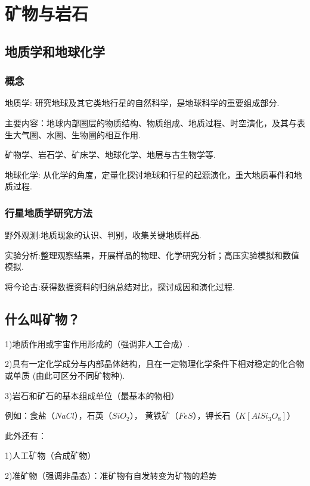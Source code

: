 \documentclass[12pt,a4paper]{article}
\begin{document}
	\section{矿物与岩石}
	
	\subsection{地质学和地球化学}
	\subsubsection{概念}
	地质学: 研究地球及其它类地行星的自然科学，是地球科学的重要组成部分.
	
	主要内容：地球内部圈层的物质结构、物质组成、地质过程、时空演化，及其与表生大气圈、水圈、生物圈的相互作用.
	
	矿物学、岩石学、矿床学、地球化学、地层与古生物学等.
	
	地球化学: 从化学的角度，定量化探讨地球和行星的起源演化，重大地质事件和地质过程.
	
	\subsubsection{行星地质学研究方法}
	野外观测:地质现象的认识、判别，收集关键地质样品.
	
	实验分析:整理观察结果，开展样品的物理、化学研究分析；高压实验模拟和数值模拟.
	
	将今论古:获得数据资料的归纳总结对比，探讨成因和演化过程.
	
	\subsection{什么叫矿物？}
	1)地质作用或宇宙作用形成的（强调非人工合成）.
	
	2)具有一定化学成分与内部晶体结构，且在一定物理化学条件下相对稳定的化合物或单质 (由此可区分不同矿物种).
	
	3)岩石和矿石的基本组成单位（最基本的物相）
	
	例如：食盐（$NaCl$），石英（$SiO_2$）， 黄铁矿（$FeS$），钾长石（$K[AlSi_3O_8]$）
	
	此外还有：
	
	1)人工矿物（合成矿物）
	
	2)准矿物（强调非晶态）：准矿物有自发转变为矿物的趋势
\end{document}
